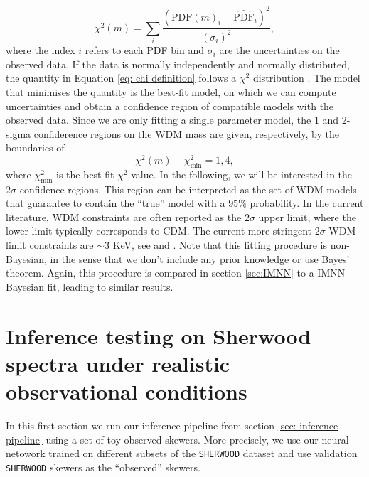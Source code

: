 \begin{equation}\label{eq: chi definition}
    \chi^2 (m)=\sum_i \frac{(\text{PDF}(m)_i-\widehat{\text{PDF}}_i)^2}{(\sigma_i)^2},
\end{equation}
where the index $i$ refers to each PDF bin and $\sigma_i$ are the uncertainties on the observed data. If the data is normally independently and normally distributed, the quantity in Equation \ref{eq: chi definition} follows a $\chi^2$ distribution \cite{numerical_recipees_c}. The model that minimises the quantity is the best-fit model, on which we can compute uncertainties and obtain a confidence region of compatible models with the observed data. Since we are only fitting a single parameter model, the 1 and 2-sigma confiderence regions on the WDM mass are given, respectively, by the boundaries of 
\begin{equation}\label{eq:sigma chi square}
    \chi^2(m)-\chi^2_{\text{min}}=1,4,
\end{equation}
where $\chi^2_{\text{min}}$ is the best-fit $\chi^2$ value.
In the following, we will be interested in the $2\sigma$ confidence regions. This region can be interpreted as the set of WDM models that guarantee to contain the ``true'' model with a $95\%$ probability. In the current literature, WDM constraints are often reported as the $2\sigma$ upper limit, where the lower limit typically corresponds to CDM. The current more stringent $2\sigma$
WDM limit constraints are $\sim 3$ KeV, see \cite{Villasenor_2023} and \cite{sherwood_wdm}.
Note that this fitting procedure is non-Bayesian, in the sense that we don't include any prior knowledge or use Bayes' theorem. Again, this procedure is compared in section \ref{sec:IMNN} to a IMNN Bayesian fit, leading to similar results. 





\section{Inference testing on Sherwood spectra under realistic observational conditions}\label{sec:inference test sherwood}
In this first section we run our inference pipeline from section \ref{sec: inference pipeline} using a set of toy observed skewers. More precisely, we use our neural netowork trained on different subsets of the \texttt{SHERWOOD} dataset and use validation \texttt{SHERWOOD} skewers as the ``observed'' skewers.

